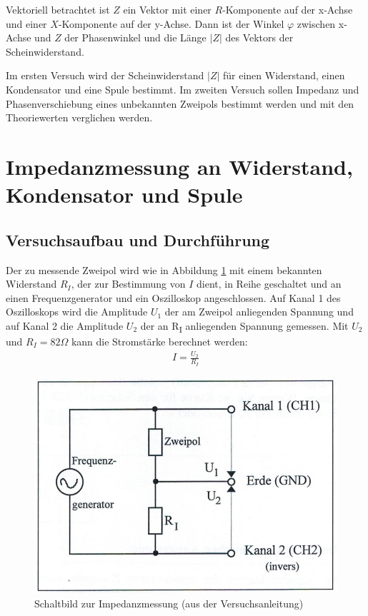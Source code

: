 \documentclass{scrartcl}
\begin{document}
Vektoriell betrachtet ist $Z$ ein Vektor mit einer $R$-Komponente auf der x-Achse und einer $X$-Komponente auf der y-Achse. Dann ist der Winkel $\varphi$ zwischen x-Achse und $Z$ der Phasenwinkel und die Länge $|Z|$ des Vektors der Scheinwiderstand.

Im ersten Versuch wird der Scheinwiderstand $|Z|$ für einen Widerstand, einen Kondensator und eine Spule bestimmt. Im zweiten Versuch sollen Impedanz und Phasenverschiebung eines unbekannten Zweipols bestimmt werden und mit den Theoriewerten verglichen werden.
\section{Impedanzmessung an Widerstand, Kondensator und Spule}
\subsection{Versuchsaufbau und Durchführung}
Der zu messende Zweipol wird wie in Abbildung \ref{fig:Aufbau} mit einem bekannten Widerstand $R_{I}$, der zur Bestimmung von $I$ dient, in Reihe geschaltet und an einen Frequenzgenerator und ein Oszilloskop angeschlossen. Auf Kanal 1 des Oszilloskops wird die Amplitude $U_{1}$ der am Zweipol anliegenden Spannung und auf Kanal 2 die Amplitude $U_{2}$ der an R\textsubscript{I} anliegenden Spannung gemessen. Mit $U_{2}$ und $R_{I} = 82 \Omega$ kann die Stromstärke berechnet werden:
\begin{align*}
I = \frac{U_{2}}{R_{I}}
\end{align*}
\begin{figure}[H]
  \centering
    \includegraphics[scale=0.75]{Aufbau.PNG}
  \caption{Schaltbild zur Impedanzmessung (aus der Versuchsanleitung)}
  \label{fig:Aufbau}
\end{figure}
\end{document}
